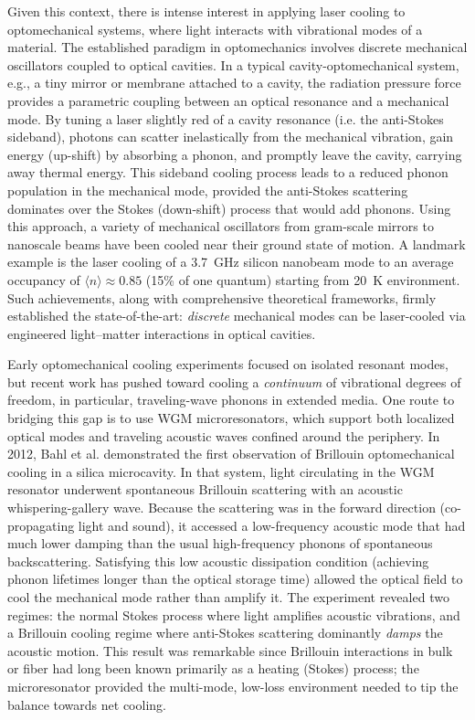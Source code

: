 Given this context, there is intense interest in applying laser cooling to optomechanical systems, where light interacts with vibrational modes of a material. The established paradigm in optomechanics involves discrete mechanical oscillators coupled to optical cavities. \cite{aspelmeyer2014cavity} In a typical cavity-optomechanical system, e.g., a tiny mirror or membrane attached to a cavity, the radiation pressure force provides a parametric coupling between an optical resonance and a mechanical mode. \cite{aspelmeyer2014cavity} By tuning a laser slightly red of a cavity resonance (i.e. the anti-Stokes sideband), photons can scatter inelastically from the mechanical vibration, gain energy (up-shift) by absorbing a phonon, and promptly leave the cavity, carrying away thermal energy. This sideband cooling process leads to a reduced phonon population in the mechanical mode, provided the anti-Stokes scattering dominates over the Stokes (down-shift) process that would add phonons. Using this approach, a variety of mechanical oscillators from gram-scale mirrors to nanoscale beams have been cooled near their ground state of motion. \cite{chan2011laser} A landmark example is the laser cooling of a \SI{3.7}{\giga\hertz} silicon nanobeam mode to an average occupancy of \(\langle n\rangle \approx 0.85\) (15\% of one quantum) starting from \SI{20}{\kelvin} environment. \cite{chan2011laser} Such achievements, along with comprehensive theoretical frameworks\cite{aspelmeyer2014cavity}, firmly established the state-of-the-art: \emph{discrete} mechanical modes can be laser-cooled via engineered light–matter interactions in optical cavities.

Early optomechanical cooling experiments focused on isolated resonant modes, but recent work has pushed toward cooling a \emph{continuum} of vibrational degrees of freedom, in particular, traveling-wave phonons in extended media. One route to bridging this gap is to use \ac{WGM} microresonators, which support both localized optical modes and traveling acoustic waves confined around the periphery. In 2012, Bahl et al. demonstrated the first observation of Brillouin optomechanical cooling in a silica microcavity. \cite{bahl2012observation} In that system, light circulating in the \ac{WGM} resonator underwent spontaneous Brillouin scattering with an acoustic whispering-gallery wave. Because the scattering was in the forward direction (co-propagating light and sound), it accessed a low-frequency acoustic mode that had much lower damping than the usual high-frequency phonons of spontaneous backscattering. Satisfying this low acoustic dissipation condition (achieving phonon lifetimes longer than the optical storage time) allowed the optical field to cool the mechanical mode rather than amplify it. The experiment revealed two regimes: the normal Stokes process where light amplifies acoustic vibrations, and a Brillouin cooling regime where anti-Stokes scattering dominantly \emph{damps} the acoustic motion. This result was remarkable since Brillouin interactions in bulk or fiber had long been known primarily as a heating (Stokes) process; the microresonator provided the multi-mode, low-loss environment needed to tip the balance towards net cooling.

